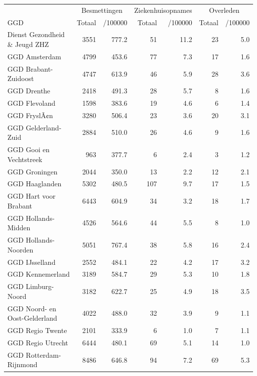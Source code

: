 \documentclass[
  english,
  man,floatsintext]{apa6}
\begin{document}
\begin{table}
\centering\begingroup\fontsize{10}{12}\selectfont

\begin{threeparttable}
\begin{tabular}{lrrrrrr}
\toprule
\multicolumn{1}{c}{ } & \multicolumn{2}{c}{Besmettingen} & \multicolumn{2}{c}{Ziekenhuisopnames} & \multicolumn{2}{c}{Overleden} \\
\cmidrule(l{3pt}r{3pt}){2-3} \cmidrule(l{3pt}r{3pt}){4-5} \cmidrule(l{3pt}r{3pt}){6-7}
GGD & Totaal & /100000 & Totaal & /100000 & Totaal & /100000\\
\midrule
Dienst Gezondheid \& Jeugd ZHZ & 3551 & 777.2 & 51 & 11.2 & 23 & 5.0\\
GGD Amsterdam & 4799 & 453.6 & 77 & 7.3 & 17 & 1.6\\
GGD Brabant-Zuidoost & 4747 & 613.9 & 46 & 5.9 & 28 & 3.6\\
GGD Drenthe & 2418 & 491.3 & 28 & 5.7 & 8 & 1.6\\
GGD Flevoland & 1598 & 383.6 & 19 & 4.6 & 6 & 1.4\\
GGD FryslÃ¢n & 3280 & 506.4 & 23 & 3.6 & 20 & 3.1\\
GGD Gelderland-Zuid & 2884 & 510.0 & 26 & 4.6 & 9 & 1.6\\
GGD Gooi en Vechtstreek & 963 & 377.7 & 6 & 2.4 & 3 & 1.2\\
GGD Groningen & 2044 & 350.0 & 13 & 2.2 & 12 & 2.1\\
GGD Haaglanden & 5302 & 480.5 & 107 & 9.7 & 17 & 1.5\\
GGD Hart voor Brabant & 6443 & 604.9 & 34 & 3.2 & 18 & 1.7\\
GGD Hollands-Midden & 4526 & 564.6 & 44 & 5.5 & 8 & 1.0\\
GGD Hollands-Noorden & 5051 & 767.4 & 38 & 5.8 & 16 & 2.4\\
GGD IJsselland & 2552 & 484.1 & 22 & 4.2 & 17 & 3.2\\
GGD Kennemerland & 3189 & 584.7 & 29 & 5.3 & 10 & 1.8\\
GGD Limburg-Noord & 3182 & 622.7 & 25 & 4.9 & 18 & 3.5\\
GGD Noord- en Oost-Gelderland & 4022 & 488.0 & 32 & 3.9 & 9 & 1.1\\
GGD Regio Twente & 2101 & 333.9 & 6 & 1.0 & 7 & 1.1\\
GGD Regio Utrecht & 6444 & 480.1 & 69 & 5.1 & 14 & 1.0\\
GGD Rotterdam-Rijnmond & 8486 & 646.8 & 94 & 7.2 & 69 & 5.3\\

\end{tabular}
\end{threeparttable}
\end{table}
\end{document}
